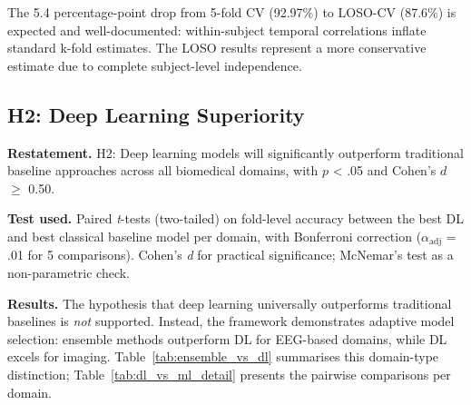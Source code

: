 The 5.4 percentage-point drop from 5-fold CV (92.97\%) to LOSO-CV (87.6\%) is expected and well-documented: within-subject temporal correlations inflate standard k-fold estimates. The LOSO results represent a more conservative estimate due to complete subject-level independence.
\fi


\subsection{H2: Deep Learning Superiority}

\textbf{Restatement.} H2: Deep learning models will significantly outperform traditional baseline approaches across all biomedical domains, with $p$ < .05 and Cohen's $d$ $\geq$ 0.50.

\textbf{Test used.} Paired \textit{t}-tests (two-tailed) on fold-level accuracy between the best DL and best classical baseline model per domain, with Bonferroni correction ($\alpha_{\text{adj}}$ = .01 for 5 comparisons). Cohen's \textit{d} for practical significance; McNemar's test as a non-parametric check.

\textbf{Results.} The hypothesis that deep learning universally outperforms traditional baselines is \textit{not} supported. Instead, the framework demonstrates adaptive model selection: ensemble methods outperform DL for EEG-based domains, while DL excels for imaging. Table~\ref{tab:ensemble_vs_dl} summarises this domain-type distinction; Table~\ref{tab:dl_vs_ml_detail} presents the pairwise comparisons per domain.

\iffalse %

